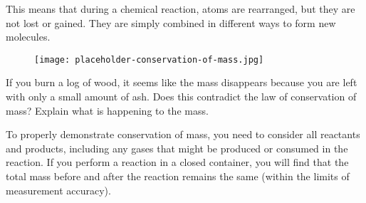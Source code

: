 \begin{marginnote}
\end{marginnote}

This means that during a chemical reaction, atoms are rearranged, but they are not lost or gained. They are simply combined in different ways to form new molecules.

\begin{figure}
\centering
\texttt{[image: placeholder-conservation-of-mass.jpg]}
\end{figure}

\begin{stopandthink}
If you burn a log of wood, it seems like the mass disappears because you are left with only a small amount of ash. Does this contradict the law of conservation of mass? Explain what is happening to the mass.
\end{stopandthink}

To properly demonstrate conservation of mass, you need to consider all reactants and products, including any gases that might be produced or consumed in the reaction.  If you perform a reaction in a closed container, you will find that the total mass before and after the reaction remains the same (within the limits of measurement accuracy).

